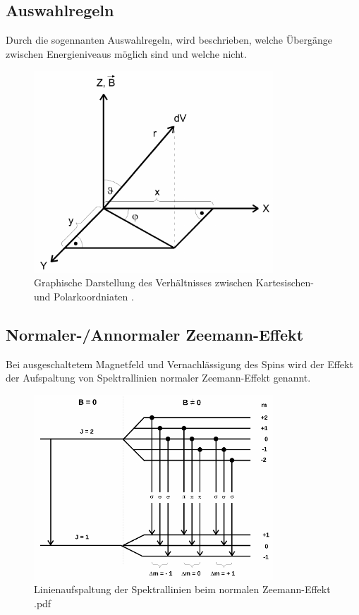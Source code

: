 \subsection{Auswahlregeln}
\label{sec:Auswahlregeln}
Durch die sogennanten Auswahlregeln, wird beschrieben, welche Übergänge zwischen
Energieniveaus möglich sind und welche nicht.
\begin{figure}[htb]
  \centering
  \includegraphics[width=0.8\textwidth]{images/V27_2.pdf}
  \caption{Graphische Darstellung des Verhältnisses zwischen Kartesischen- und Polarkoordniaten \cite{anleitung}.}
  \label{abb:polar}
\end{figure}

\subsection{Normaler-/Annormaler Zeemann-Effekt}
\label{sec:Zeemann}
Bei ausgeschaltetem Magnetfeld und Vernachlässigung des Spins wird der Effekt der
Aufspaltung von Spektrallinien normaler Zeemann-Effekt genannt.

\begin{figure}[htb]
  \centering
  \includegraphics[width=0.8\textwidth]{images/V27_3.pdf}
  \caption{Linienaufspaltung der Spektrallinien beim normalen Zeemann-Effekt \cite{anleitung}.pdf}
  \label{abb:normal}
\end{figure}

